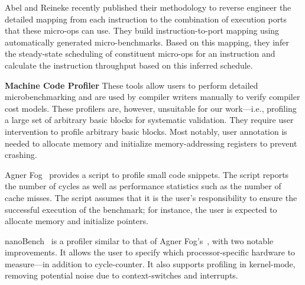 Abel and Reineke\cite{uops} recently published their methodology
to reverse engineer the detailed mapping from each instruction to the
combination of execution ports
that these micro-ops can use.
They build instruction-to-port mapping using automatically generated micro-benchmarks.
Based on this mapping, they infer the steady-state scheduling of constituent
micro-ops for an instruction and calculate the instruction throughput based on
this inferred schedule.

\textbf{Machine Code Profiler} These tools allow users to perform
detailed microbenchmarking and are used by compiler writers manually
to verify compiler cost models.
These profilers are, however, unsuitable for our work---i.e., profiling
a large set of arbitrary basic blocks for systematic validation.
They require user intervention to profile arbitrary basic blocks. Most notably,
user annotation is needed to allocate memory and
initialize memory-addressing registers to prevent crashing.

Agner Fog~\cite{agner} provides a script to profile small code snippets.
The script reports the number of cycles as well as performance statistics such as 
the number of cache misses.
The script assumes that it is the user's responsibility to ensure
the successful execution of the benchmark;
for instance, the user is expected to allocate memory and initialize pointers.

nanoBench~\cite{nanobench} is a profiler similar to that of Agner Fog's~\cite{agner},
with two notable improvements.
It allows the user to specify which processor-specific hardware
to measure---in addition to cycle-counter. It also supports profiling in kernel-mode,
removing potential noise due to context-switches and interrupts.

